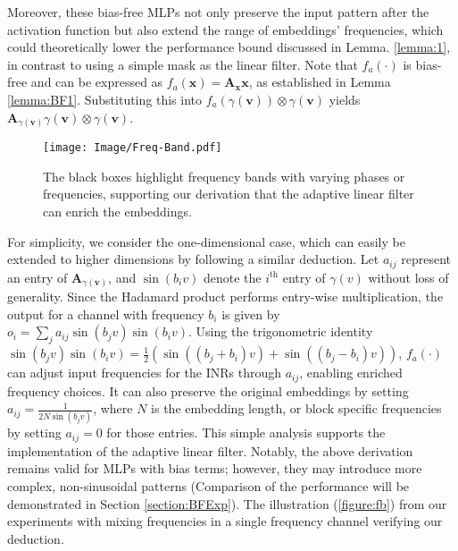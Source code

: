 Moreover, these bias-free MLPs not only preserve the input pattern after the activation function but also extend the range of embeddings' frequencies, which could theoretically lower the performance bound discussed in  Lemma. \ref{lemma:1}, in contrast to using a simple mask as the linear filter. Note that \( f_{a}(\cdot) \) is bias-free and can be expressed as \( f_{a}(\mathbf{x}) = \mathbf{A}_{\mathbf{x}} \mathbf{x} \), as established in Lemma \ref{lemma:BF1}. Substituting this into \( f_{a}(\gamma(\mathbf{v})) \otimes \gamma(\mathbf{v}) \) yields \( \mathbf{A}_{\gamma(\mathbf{v})} \gamma(\mathbf{v}) \otimes \gamma(\mathbf{v}) \). 
\begin{figure}[!b]
 \vspace{-5pt}
    \centering
    \texttt{[image: Image/Freq-Band.pdf]}
    \vspace{-10pt}
    \caption{The black boxes highlight frequency bands with varying phases or frequencies, supporting our derivation that the adaptive linear filter can enrich the embeddings.
}
    \label{figure:fb}
   
\end{figure}
For simplicity, we consider the one-dimensional case, which can easily be extended to higher dimensions by following a similar deduction. Let \( a_{ij} \) represent an entry of \( \mathbf{A}_{\gamma(\mathbf{v})} \), and \( \sin(b_i v) \) denote the \( i^{\text{th}} \) entry of \( \gamma(v) \) without loss of generality. Since the Hadamard product performs entry-wise multiplication, the output for a channel with frequency \( b_i \) is given by \( o_i = \sum_j a_{ij} \sin(b_j v) \sin(b_i v) \). Using the trigonometric identity \( \sin(b_j v) \sin(b_i v) = \frac{1}{2} (\sin((b_j + b_i) v) + \sin((b_j - b_i) v)) \), \( f_a(\cdot) \) can adjust input frequencies for the INRs through \( a_{ij} \), enabling enriched frequency choices. It can also preserve the original embeddings by setting \( a_{ij} = \frac{1}{2N \sin(b_j v)} \), where \( N \) is the embedding length, or block specific frequencies by setting \( a_{ij} = 0 \) for those entries. This simple analysis supports the implementation of the adaptive linear filter. Notably, the above derivation remains valid for MLPs with bias terms; however, they may introduce more complex, non-sinusoidal patterns (Comparison of the performance will be demonstrated in Section \ref{section:BFExp}).
 The illustration (\autoref{figure:fb}) from our experiments with mixing frequencies in a single frequency channel verifying our deduction.

